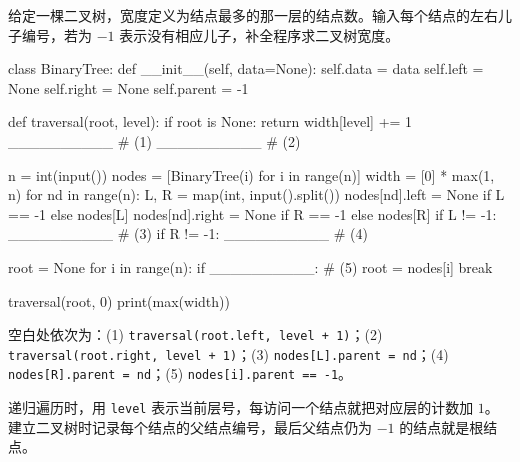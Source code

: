 \begin{question}[二叉树宽度]
给定一棵二叉树，宽度定义为结点最多的那一层的结点数。输入每个结点的左右儿子编号，若为 $-1$ 表示没有相应儿子，补全程序求二叉树宽度。

\begin{pycode}
class BinaryTree:
    def __init__(self, data=None):
        self.data = data
        self.left = None
        self.right = None
        self.parent = -1


def traversal(root, level):
    if root is None:
        return
    width[level] += 1
    __________                                  # (1)
    __________                                  # (2)


n = int(input())
nodes = [BinaryTree(i) for i in range(n)]
width = [0] * max(1, n)
for nd in range(n):
    L, R = map(int, input().split())
    nodes[nd].left = None if L == -1 else nodes[L]
    nodes[nd].right = None if R == -1 else nodes[R]
    if L != -1:
        __________                              # (3)
    if R != -1:
        __________                              # (4)

root = None
for i in range(n):
    if __________:                              # (5)
        root = nodes[i]
        break

traversal(root, 0)
print(max(width))
\end{pycode}
\begin{solution}
空白处依次为：(1) \texttt{traversal(root.left, level + 1)}；(2) \texttt{traversal(root.right, level + 1)}；(3) \texttt{nodes[L].parent = nd}；(4) \texttt{nodes[R].parent = nd}；(5) \texttt{nodes[i].parent == -1}。

递归遍历时，用 \texttt{level} 表示当前层号，每访问一个结点就把对应层的计数加 $1$。建立二叉树时记录每个结点的父结点编号，最后父结点仍为 $-1$ 的结点就是根结点。
\end{solution}
\end{question}


